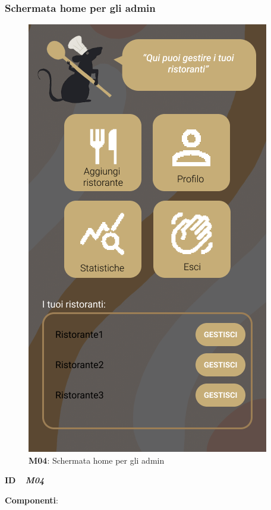         \subsubsection{Schermata home per gli admin}
        \begin{figure}[H]
            \centering
            \includegraphics[scale=0.35]{assets/diagrammi/Mockup/Mockup_AdminDash.png}
            \caption{\textbf{M04}: Schermata home per gli admin}\label{fig:Mockup_AdminDashboard}
        \end{figure}
        \begin{flushleft}
            \textbf{ID} \ \Large{ \emph{\textbf{M04}}} \\
        \end{flushleft}
        \textbf{Componenti}:

